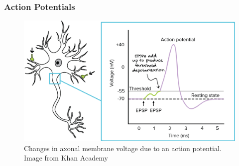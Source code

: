 \documentclass{beamer}
\begin{document}
\begin{frame}
\begin{columns}
\begin{column}{.5\textwidth}
    \end{column}
  \end{columns}
\end{frame}

\begin{frame}
\frametitle{Action Potentials}
\begin{figure}
\includegraphics[width=\textwidth]{actionpotential}
\caption{Changes in axonal membrane voltage due to an action potential. Image from Khan Academy}
\end{figure}
\end{frame}
\end{document}
